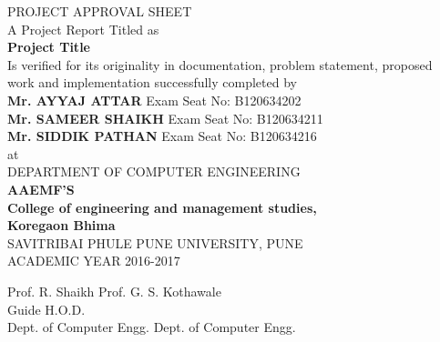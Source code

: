 \newpage
\thispagestyle{empty}

\begin{center}

PROJECT APPROVAL SHEET\\[3\baselineskip]



{\small A Project Report Titled as}\\[\baselineskip]

\textbf{{\large Project Title}}\\[\baselineskip]

Is verified for its originality in documentation, problem statement, proposed\\
work and implementation successfully completed by\\[2\baselineskip]


\textbf{Mr. AYYAJ ATTAR} Exam Seat No: B120634202\\
\textbf{Mr. SAMEER SHAIKH} Exam Seat No: B120634211\\
\textbf{Mr. SIDDIK PATHAN} Exam Seat No: B120634216\\[\baselineskip]

at\\[4\baselineskip]




DEPARTMENT OF COMPUTER ENGINEERING\\
\textbf{AAEMF’S}\\
\textbf{College of engineering and management studies,}\\
\textbf{Koregaon Bhima}\\
SAVITRIBAI PHULE PUNE UNIVERSITY, PUNE\\
ACADEMIC YEAR 2016-2017\\

\vfill

\noindent
\hspace*{0.75cm}Prof. R. Shaikh \hfill Prof. G. S. Kothawale\hspace*{0.25cm} \\
\hspace*{1.75cm}Guide \hfill H.O.D.\hspace*{1.5cm} \\
Dept. of Computer Engg. \hfill Dept. of Computer Engg.


\end{center}